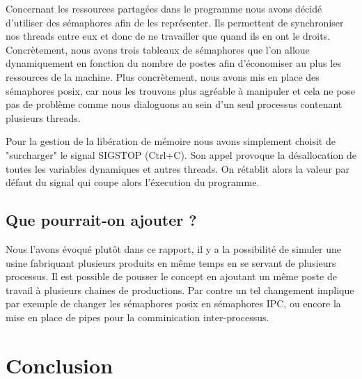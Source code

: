 \documentclass[11pt]{report}
\begin{document}
	Concernant les ressources partagées dans le programme nous avons décidé d'utiliser des sémaphores afin de les représenter. Ils permettent de synchroniser nos threads entre eux et donc de ne travailler que quand ils en ont le droits. Concrètement, nous avons trois tableaux de sémaphores que l'on alloue dynamiquement en fonction du nombre de postes afin d'économiser au plus les ressources de la machine. Plus concrètement, nous avons mis en place des sémaphores posix, car nous les trouvons plus agréable à manipuler et cela ne pose pas de problème comme nous dialoguons au sein d'un seul processus contenant plusieurs threads. 
	
	Pour la gestion de la libération de mémoire nous avons simplement choisit de "surcharger" le signal SIGSTOP (Ctrl+C). Son appel provoque la désallocation de toutes les variables dynamiques et autres threads. On rétablit alors la valeur par défaut du signal qui coupe alors l'éxecution du programme.
	
	\section{Que pourrait-on ajouter ?}
	
	Nous l'avons évoqué plutôt dans ce rapport, il y a la possibilité de simuler une usine fabriquant plusieurs produits en même temps en se servant de plusieurs processus. Il est possible de pousser le concept en ajoutant un même poste de travail à plusieurs chaines de productions. Par contre un tel changement implique par exemple de changer les sémaphores posix en sémaphores IPC, ou encore la mise en place de pipes pour la comminication inter-processus.
\chapter{Conclusion}
\end{document}
